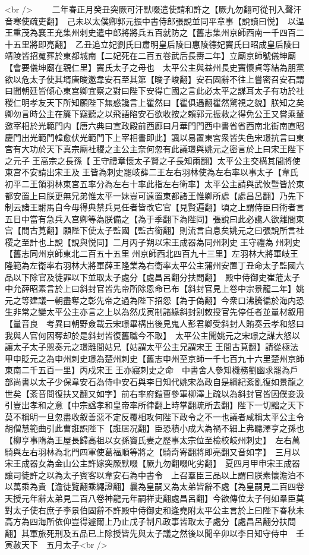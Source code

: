<br />
　　二年春正月癸丑突厥可汗默啜遣使請和許之【厥九勿翻可從刊入聲汗音寒使疏吏翻】　己未以太僕卿郭元振中書侍郎張說並同平章事【說讀曰悦】　以温王重茂為襄王充集州刺史遣中郎將將兵五百就防之【舊志集州京師西南一千四百二十五里將即亮翻】　乙丑追立妃劉氏曰肅明皇后陵曰惠陵德妃竇氏曰昭成皇后陵曰靖陵皆招䰟葬於東都城南【二妃死在二百五卷武后長夀二年】立廟京師號儀坤廟【會要儀坤廟在親仁里】竇氏太子之母也　太平公主與益州長史竇懷貞等結為朋黨欲以危太子使其壻唐晙邀韋安石至其第【晙子峻翻】安石固辭不往上嘗密召安石謂曰聞朝廷皆傾心東宫卿宜察之對曰陛下安得亡國之言此必太平之謀耳太子有功於社稷仁明孝友天下所知願陛下無惑讒言上瞿然曰【瞿俱遇翻瞿然驚視之貌】朕知之矣卿勿言時公主在簾下竊聽之以飛語陷安石欲收按之賴郭元振救之得免公王又嘗乘輦邀宰相於光範門内【唐六典曰宣政殿前西廊曰月華門門西中書省省西南北街南直昭慶門出光範門韓愈伏光範門下上宰相書即此】諷以易置東宮衆皆失色宋璟抗言曰東宫有大功於天下真宗廟社稷之主公主奈何忽有此議璟與姚元之密言於上曰宋王陛下之元子王高宗之長孫【王守禮章懷太子賢之子長知兩翻】太平公主交構其間將使東宫不安請出宋王及王皆為刺史罷岐薛二王左右羽林使為左右率以事太子【韋氏初平二王領羽林東宮五率分為左右十率此指左右衛率】太平公主請與武攸暨皆於東都安置上曰朕更無兄弟惟太平一妹豈可遠置東都諸王惟卿所處【處昌呂翻】乃先下制云諸王駙馬自今毋得典禁兵見任者皆改它官【見賢遍翻】頃之上謂侍臣曰術者言五日中當有急兵入宫卿等為朕備之【為于季翻下為陛同】張說曰此必讒人欲離間東宫【間古莧翻】願陛下使太子監國【監古銜翻】則流言自息矣姚元之曰張說所言社稷之至計也上說【說與悦同】二月丙子朔以宋王成器為同州刺史王守禮為州刺史【舊志同州京師東北二百五十五里州京師西北四百九十三里】左羽林大將軍岐王隆範為左衛率右羽林大將軍薛王隆業為右衛率太平公主蒲州安置丁丑命太子監國六品以下除官及徒罪以下並取太子處分【處昌呂翻分扶問翻】　殿中侍御史崔蒞太子中允薛昭素言於上曰斜封官皆先帝所除恩命已布【斜封官見上卷中宗景龍二年】姚元之等建議一朝盡奪之彰先帝之過為陛下招怨【為于偽翻】今衆口沸騰徧於海内恐生非常之變太平公主亦言之上以為然戊寅制諸緣斜封别敇授官先停任者並量材叙用【量音良　考異曰朝野僉載云宋璟畢構出後見鬼人彭君卿受斜封人賄奏云孝和怒曰我與人官何因奪却於是斜封皆復舊職今不取】　太平公主聞姚元之宋璟之謀大怒以讓太子太子愳奏元之璟離間姑兄【姑謂太平公主兄謂宋王王間古莧翻】請從極法甲申貶元之為申州刺史璟為楚州刺史【舊志申州至京師一千七百九十六里楚州京師東南二千五百一里】丙戍宋王王亦寢刺史之命　中書舍人參知機務劉幽求罷為戶部尚書以太子少保韋安石為侍中安石與李日知代姚宋為政自是綱紀紊亂復如景龍之世矣【紊音問復扶又翻又如字】前右率府鎧曹參軍柳澤上疏以為斜封官皆因僕妾汲引豈出孝和之意【中宗諡孝和皇帝率所律翻上時掌翻疏所去翻】陛下一切黜之天下莫不稱明一旦忽盡收叙善惡不定反覆相攻何陛下政令之不一也議者咸稱太平公主令胡僧慧範曲引此曹誑誤陛下【誑居况翻】臣恐積小成大為禍不細上弗聽澤亨之孫也【柳亨事隋為王屋長歸高祖以女孫竇氏妻之歷事太宗位至檢校岐州刺史】　左右萬騎與左右羽林為北門四軍使葛福順等將之【騎奇寄翻將即亮翻又音如字】　三月以宋王成器女為金山公主許嫁突厥默啜【厥九勿翻啜叱劣翻】　夏四月甲申宋王成器讓司徒許之以為太子賓客以韋安石為中書令　上召羣臣三品以上謂曰朕素懷澹泊不以萬乘為貴【澹徒覽翻乘繩證翻】曩為皇嗣又為太弟皆辭不處【為皇嗣見二百四卷天授元年辭太弟見二百八卷神龍元年嗣祥吏翻處昌呂翻】今欲傳位太子何如羣臣莫對太子使右庶子李景伯固辭不許殿中侍御史和逢堯附太平公主言於上曰陛下春秋未高方為四海所依仰豈得遽爾上乃止戊子制凡政事皆取太子處分【處昌呂翻分扶問翻】其軍旅死刑及五品已上除授皆先與太子議之然後以聞辛卯以李日知守侍中　壬寅赦天下　五月太子<br />
